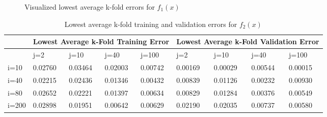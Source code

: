 \documentclass{tron}
\begin{document}
\begin{figure}[H]
	\centering
	\caption{Visualized lowest average k-fold errors for $f_1(x)$ \label{fig:p3:matrix-score:1}}
\end{figure}

\begin{table}[H]
	\centering
	\begin{tabular}{ |p{1.5cm}||p{1.5cm}|p{1.5cm}|p{1.5cm}|p{1.5cm}||p{1.5cm}|p{1.5cm}|p{1.5cm}|p{1.5cm}|  }
	 \hline
	 	& \multicolumn{4}{|c|}{Lowest Average k-Fold Training Error} & \multicolumn{4}{|c|}{Lowest Average k-Fold Validation Error} \\
	 \hline
	   	& j=2 & j=10 & j=40 & j=100 & j=2 & j=10 & j=40 & j=100\\
	 \hline
i=10 & 0.02760 & 0.03464 & 0.02003 & 0.00742 & 0.00169 & 0.00029 & 0.00544 & 0.00015 \\ \hline
i=40 & 0.02215 & 0.02436 & 0.01346 & 0.00432 & 0.00839 & 0.01126 & \cellcolor{red!20!white} 0.00232 & 0.00930 \\ \hline
i=80 & 0.02652 & 0.02221 & 0.01397 & 0.00634 & 0.00829 & 0.01284 & 0.00376 & 0.00549 \\ \hline
i=200& 0.02898 & 0.01951 & 0.00642 & 0.00629 & 0.02190 & 0.02035 & 0.00737 & 0.00580 \\ \hline
	\end{tabular}
	\caption{Lowest average k-fold training and validation errors for $f_2(x)$}
	\label{table:16tests:2}
\end{table}
\end{document}
